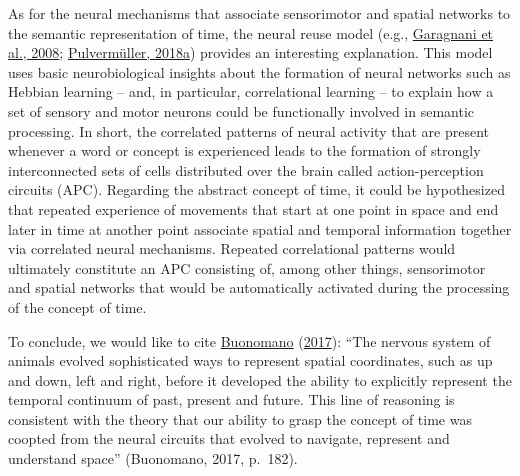 \documentclass[
  a4paper,12pt,twoside,onecolumn,openright,final,oldfontcommands]{memoir}
\begin{document}
As for the neural mechanisms that associate sensorimotor and spatial networks to the semantic representation of time, the neural reuse model (e.g., \protect\hyperlink{ref-garagnani_neuroanatomically_2008}{Garagnani et al., 2008}; \protect\hyperlink{ref-pulvermuller_neural_2018}{Pulvermüller, 2018a}) provides an interesting explanation. This model uses basic neurobiological insights about the formation of neural networks such as Hebbian learning -- and, in particular, correlational learning -- to explain how a set of sensory and motor neurons could be functionally involved in semantic processing. In short, the correlated patterns of neural activity that are present whenever a word or concept is experienced leads to the formation of strongly interconnected sets of cells distributed over the brain called action-perception circuits (APC). Regarding the abstract concept of time, it could be hypothesized that repeated experience of movements that start at one point in space and end later in time at another point associate spatial and temporal information together via correlated neural mechanisms. Repeated correlational patterns would ultimately constitute an APC consisting of, among other things, sensorimotor and spatial networks that would be automatically activated during the processing of the concept of time.

To conclude, we would like to cite \protect\hyperlink{ref-buonomano_your_2017}{Buonomano} (\protect\hyperlink{ref-buonomano_your_2017}{2017}): ``The nervous system of animals evolved sophisticated ways to represent spatial coordinates, such as up and down, left and right, before it developed the ability to explicitly represent the temporal continuum of past, present and future. This line of reasoning is consistent with the theory that our ability to grasp the concept of time was coopted from the neural circuits that evolved to navigate, represent and understand space'' (Buonomano, 2017, p.~182).

\newpage
\end{document}

